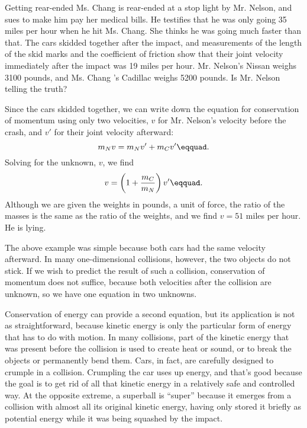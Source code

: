 \begin{eg}{Getting rear-ended}\label{eg:rear-ended}
\egquestion Ms. Chang is rear-ended at a stop light by Mr.
Nelson, and sues to make him pay her medical bills. He
testifies that he was only going 35 miles per hour when he
hit Ms. Chang. She thinks he was going much faster than
that. The cars skidded together after the impact, and
measurements of the length of the skid marks and the
coefficient of friction show that their joint velocity
immediately after the impact was 19 miles per hour. Mr.
Nelson's Nissan weighs 3100 pounds, and Ms. Chang 's
Cadillac weighs 5200 pounds. Is Mr. Nelson telling the truth?

\eganswer Since the cars skidded together, we can write down
the equation for conservation of momentum using only two
velocities, $v$ for Mr. Nelson's velocity before the crash,
and $v'$ for their joint velocity afterward:
\begin{equation*}
                m_N v  =  m_N v' + m_C v'\eqquad.
\end{equation*}
Solving for the unknown, $v$, we find
\begin{equation*}
                v  =   \left(1+\frac{m_C}{m_N}\right)v'\eqquad.
\end{equation*}
Although we are given the weights in pounds, a unit of
force, the ratio of the masses is the same as the ratio of
the weights, and we find $v=51$ miles per hour. He is lying.
\end{eg}

The above example was simple because both cars had the same
velocity afterward. In many one-dimensional collisions,
however, the two objects do not stick. If we wish to predict
the result of such a collision, conservation of momentum
does not suffice, because both velocities after the
collision are unknown, so we have one equation in two unknowns.

Conservation of energy can provide a second equation, but
its application is not as straightforward, because kinetic
energy is only the particular form of energy that has to do
with motion. In many collisions, part of the kinetic energy
that was present before the collision is used to create heat
or sound, or to break the objects or permanently bend them.
Cars, in fact, are carefully designed to crumple in a
collision. Crumpling the car uses up energy, and that's good
because the goal is to get rid of all that kinetic energy in
a relatively safe and controlled way. At the opposite
extreme, a superball is ``super'' because it emerges from a
collision with almost all its original kinetic energy,
having only stored it briefly as potential energy while it
was being squashed by the impact.

